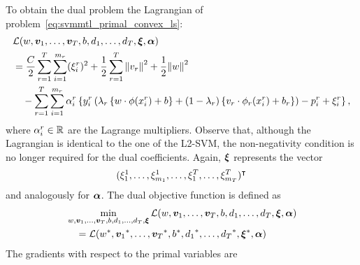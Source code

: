  To obtain the dual problem the Lagrangian of problem~\eqref{eq:svmmtl_primal_convex_ls}:
\begin{equation}\label{eq:svmmtl_lagrangian_convex_ls}
    \begin{aligned}
        & \lagr({w}, \fv{v}_1, \ldots, \fv{v}_\ntasks, b, d_1, \ldots, d_\ntasks, \fv{\xi}, \fv{\alpha}) \\
        &=  \frac{C}{2} \sum_{r= 1}^T \sum_{i=1}^{m_r} ({\xi_{i}^r})^2 + \frac{1}{2} \sum_{r= 1}^T{\norm{{v}_r}^2} + \frac{1}{2} {\norm{{w}}}^2 \\
        &\quad -  \sum_{r= 1}^T \sum_{i=1}^{m_r} \alpha_i^r \left\lbrace y_{i}^r  \left(\lambda_r \left\lbrace {w} \cdot \phi(x_{i}^r) + b  \right\rbrace + (1 - \lambda_r) \left\lbrace {v}_r \cdot \phi_r(x_{i}^r) + b_r \right\rbrace  \right) - p_{i}^r + \xi_{i}^r  \right\rbrace ,
    \end{aligned}
\end{equation}
where $\alpha_i^r \in \mathbb{R}$ are the Lagrange multipliers. Observe that, although the Lagrangian is identical to the one of the L2-SVM, the non-negativity condition is no longer required for the dual coefficients.  Again, $\bm{\xi}$ represents the vector $$(\xi_1^1, \ldots, \xi_{m_1}^1, \ldots, \xi_1^T, \ldots, \xi_{m_T}^T)^\intercal$$ and analogously for $\bm{\alpha}$. The dual objective function is defined as 
\begin{equation}\nonumber
    \begin{aligned}
          &  \min_{{w}, \bm{v}_1, \ldots, \bm{v}_T, b, d_1, \ldots, d_T, \bm{\xi}} \mathcal{L}({w}, \bm{v}_1, \ldots, \bm{v}_T, b, d_1, \ldots, d_T, \bm{\xi}, \bm{\alpha}) \\
         &\quad = \mathcal{L}({{w}}^*, {\bm{v}_1}^*, \ldots, {\bm{v}_T}^*, {b}^*, {d_1}^*, \ldots, {d_T}^*, {\bm{\xi}}^*, \bm{\alpha})
    \end{aligned}    
\end{equation}
The gradients with respect to the primal variables are
